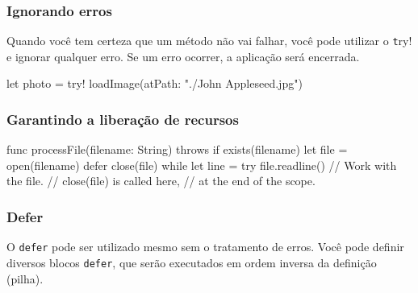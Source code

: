 \begin{frame}[fragile]
    \frametitle{Ignorando erros}

    Quando você tem certeza que um método não vai falhar, você pode
    utilizar o {\color{green} \texttt try!} e ignorar qualquer erro. Se
    um erro ocorrer, a aplicação será encerrada.
    \vspace{.7cm}
    \begin{swift}
let photo = try! loadImage(atPath: "./John Appleseed.jpg")
    \end{swift}

\end{frame}

\begin{frame}[fragile]
    \frametitle{Garantindo a liberação de recursos}
    \begin{swift}
    func processFile(filename: String) throws {
        if exists(filename) {
            let file = open(filename)
            defer {
                close(file)
            }
            while let line = try file.readline() {
                // Work with the file.
            }
            // close(file) is called here,
            // at the end of the scope.
        }
    }
    \end{swift}
\end{frame}

\begin{frame}[fragile]
    \frametitle{Defer}
    O {\color{green}\texttt{defer}} pode ser utilizado mesmo sem o
    tratamento de erros.
    \vspace{.75cm}
    Você pode definir diversos blocos {\color{green}\texttt{defer}},
    que serão executados em ordem inversa da definição (pilha).
\end{frame}


